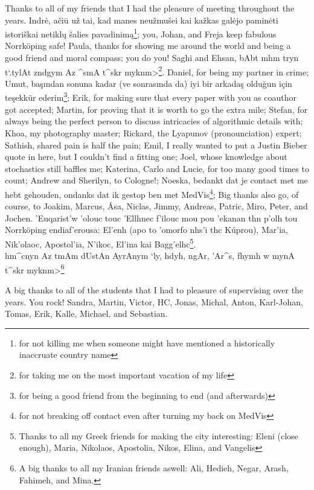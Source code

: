 Thanks to all of my friends that I had the pleasure of meeting throughout the years. Indr\.{e}, a\v{c}i\={u} u\v{z} tai, kad manes neu\v{z}mu\v{s}ei kai ka\v{z}kas gal\.{e}jo pamin\.{e}ti istori\v{s}kai netikl\k{u} \v{s}alies pavadinim\k{a}\footnote{for not killing me when someone might have mentioned a historically inaccruate country name}; you, Johan, and Freja keep fabulous Norrk\"oping safe! Paula, thanks for showing me around the world and being a good friend and moral compass; you do you! Saghi and Ehsan, {\small \<bAbt mhm tryn t`.tylAt zndgym Az ^smA t^skr myknm>}\footnote{for taking me on the most important vacation of my life}. Daniel, for being my partner in crime; Umut, ba\c{s}{\i}ndan sonuna kadar (ve sonras{\i}nda da) iyi bir arkada\c{s} oldu\u{g}un i\c{c}in te\c{s}ekk\"ur ederim\footnote{for being a good friend from the beginning to end (and afterwards)}; Erik, for making sure that every paper with you as coauthor got accepted; Martin, for proving that it is worth to go the extra mile; Stefan, for always being the perfect person to discuss intricacies of algorithmic details with; Khoa, my photography master; Rickard, the Lyapunov (pronounciation) expert; Sathish, shared pain is half the pain; Emil, I really wanted to put a Justin Bieber quote in here, but I couldn't find a fitting one; Joel, whose knowledge about stochastics still baffles me; Katerina, Carlo and Lucie, for too many good times to count; Andrew and Sherilyn, to Cologne!; Noeska, bedankt dat je contact met me hebt gehouden, ondanks dat ik gestop ben met MedVis\footnote{for not breaking off contact even after turning my back on MedVis}; Big thanks also go, of course, to Joakim, Marcus, \AA sa, Niclas, Jimmy, Andreas, Patric, Miro, Peter, and Jochen. \textgreek{'Euqarist'w 'olouc touc 'Ellhnec f'ilouc mou pou 'ekanan thn p'olh tou} Norrk\"oping \textgreek{endiaf'erousa: El'enh (apo to 'omorfo nhs'i thc K\'uprou), Mar'ia, Nik'olaoc, Apostol'ia, N'ikoc, El'ina kai Bagg'elhc}\footnote{Thanks to all my Greek friends for making the city interesting: Eleni (close enough), Maria, Nikolaos, Apostolia, Nikos, Elina, and Vangelis}. \\{\small \<hm^cnyn Az tmAm dUstAn AyrAnym `ly, hdyh, ngAr, 'Ar^s, fhymh w mynA t^skr myknm>}\footnote{A big thanks to all my Iranian friends aswell: Ali, Hedieh, Negar, Arash, Fahimeh, and Mina.}

A big thanks to all of the students that I had to pleasure of supervising over the years. You rock! Sandra, Martin, Victor, HC, Jonas, Michal, Anton, Karl-Johan, Tomas, Erik, Kalle, Michael, and Sebastian.

